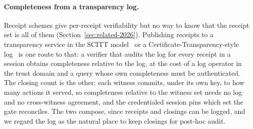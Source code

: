 \documentclass[letterpaper,10pt,twocolumn]{article}
\theoremstyle{definition}
\begin{document}
\paragraph{Completeness from a transparency log.} Receipt schemes give per-receipt verifiability but no way to know that the receipt set is all of them (Section~\ref{sec:related-2026}). Publishing receipts to a transparency service in the SCITT model~\cite{rfc9943scitt} or a Certificate-Transparency-style log~\cite{laurie2014certificate} is one route to that: a verifier that audits the log for every receipt in a session obtains completeness relative to the log, at the cost of a log operator in the trust domain and a query whose own completeness must be authenticated. The closing count is the other: each witness commits, under its own key, to how many actions it served, so completeness relative to the witness set needs no log and no cross-witness agreement, and the credentialed session pins which set the gate reconciles. The two compose, since receipts and closings can be logged, and we regard the log as the natural place to keep closings for post-hoc audit.
\end{document}
